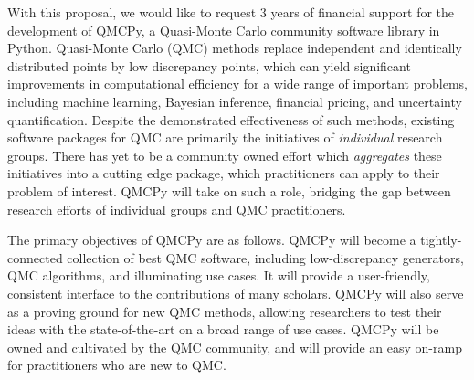 \documentclass[11pt]{article}%
\begin{document}

\noindent With this proposal, we would like to request 3 years of financial support for the development of QMCPy, a Quasi-Monte Carlo community software library in Python. Quasi-Monte Carlo (QMC) methods replace independent and identically distributed points by low discrepancy points, which can yield significant improvements in computational efficiency for a wide range of important problems, including machine learning, Bayesian inference, financial pricing, and uncertainty quantification. Despite the demonstrated effectiveness of such methods, existing software packages for QMC are primarily the initiatives of \textit{individual} research groups. There has yet to be a community owned effort which \textit{aggregates} these initiatives into a cutting edge package, which practitioners can apply to their problem of interest. QMCPy will take on such a role, bridging the gap between research efforts of individual groups and QMC practitioners.

The primary objectives of QMCPy are as follows. QMCPy will become a tightly-connected collection of best QMC software, including low-discrepancy generators, QMC algorithms, and illuminating use cases. It will provide a user-friendly, consistent interface to the contributions of many scholars. QMCPy will also serve as a proving ground for new QMC methods, allowing researchers to test their ideas with the state-of-the-art on a broad range of use cases. QMCPy will be owned and cultivated by the QMC community, and will provide an easy on-ramp for practitioners who are new to QMC.




\end{document}
